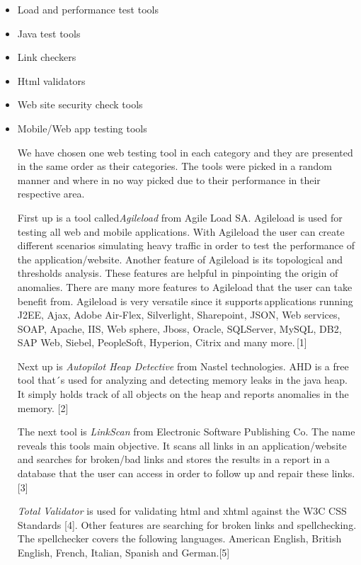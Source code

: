 \documentclass[a4paper]{article}
\begin{document}
 \begin {itemize}
 \item Load and performance test tools  
 \item Java test tools 
 \item Link checkers 
 \item Html validators 
 \item Web site security check tools 
 \item Mobile/Web app testing tools 
 
 
 
 We have chosen one web testing tool in each category and they are presented in the same order as their categories. 
 The tools were picked in a random manner and where in no way picked due to their performance in their respective area.
 
 First up is a tool called\emph {Agileload} from Agile Load SA. Agileload is used for testing all web and mobile applications.
 With Agileload the user can create different scenarios simulating heavy traffic in order to test the performance of the
 application/website. Another feature of Agileload is its topological and thresholds analysis. These features are helpful 
 in pinpointing the origin of anomalies. There are many more features to Agileload that the user can take benefit from. 
 Agileload is very versatile since it supports applications running J2EE, Ajax, Adobe Air-Flex, Silverlight, Sharepoint,  JSON, Web services, SOAP, Apache, IIS, Web sphere, Jboss, Oracle, SQLServer, MySQL, DB2, SAP Web, Siebel, PeopleSoft, Hyperion, Citrix and many more. [1] 
 
 Next up is \emph {Autopilot Heap Detective} from Nastel technologies. AHD is a free tool that´s used for analyzing and detecting 
 memory leaks in the java heap. It simply holds track of all objects on the heap and reports anomalies in the memory. [2] 
 
 The next tool is \emph {LinkScan} from Electronic Software Publishing Co. The name reveals this tools main objective. It scans all 
 links in an application/website and searches for broken/bad links and stores the results in a report in a database that the 
 user can access in order to follow up and repair these links. [3] 
 
 \emph {Total Validator} is used for validating html and xhtml against the W3C CSS Standards [4]. Other features are searching 
 for broken links and spellchecking. The spellchecker covers the following languages. American English, British English,
 French, Italian, Spanish and German.[5] 
 

\end{itemize}
\end{document}
